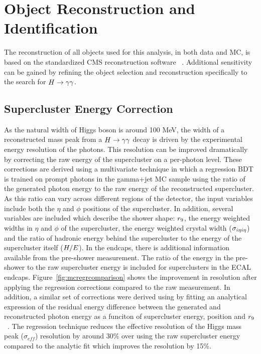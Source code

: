 \section{Object Reconstruction and Identification}
\label{sec:objectrecoandid}

The reconstruction of all objects used for this analysis, in both data and MC,
is based on the standardized CMS reconstruction software \texttt{\cmssw}~\cite{null}. 
Additional sensitivity can be gained by refining the object selection and reconstruction specifically
to the search for $H\rightarrow\gamma\gamma$.

\subsection{Supercluster Energy Correction}
\label{sec:superclusterenergyreconstruction}

As the natural width of Higgs boson is around 100 MeV, the width of a reconstructed mass peak from 
a $H\rightarrow\gamma\gamma$ decay is driven by the experimental energy resolution of the photons.
This resolution can be improved dramatically by correcting the raw energy of the supercluster 
on a per-photon level. These corrections are derived using a multivariate technique 
in which a regression BDT is trained on prompt photons in the gamma+jet MC sample using the 
ratio of the generated photon energy to the raw energy of the reconstructed supercluster.
As this ratio can vary across different regions of the detector, the input variables include both the 
$\eta$ and $\phi$ positions of the supercluster. In addition, several variables are included which 
describe the shower shape: $r_{9}$, the energy weighted widths in $\eta$ and $\phi$ of the supercluster,
the energy weighted crystal width ($\sigma_{i\eta i\eta}$) and the ratio of hadronic energy behind the supercluster
to the energy of the supercluster itself ($H/E$). In the endcaps, there is additional information 
available from the pre-shower measurement. The ratio of the energy in the pre-shower to the raw supercluster energy
is included for superclusters in the ECAL endcaps. Figure~\ref{fig:mcregrcomparison} shows the improvement
in resolution after applying the regression corrections compared to the raw measurement.
In addition, a similar set of corrections were derived using by fitting an analytical expression 
of the residual energy difference between the 
generated and reconstructed photon energy as a funciton of supercluster energy, position and $r_{9}$~\cite{AN-11-343}. 
The regression technique reduces the effective resolution of the Higgs mass peak ($\sigma_{eff}$) 
resolution by around 30\% over using the raw supercluster energy compared to the analytic fit which
improves the resolution by 15\%. 

